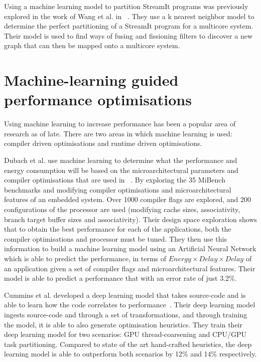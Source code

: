 Using a machine learning model to partition StreamIt programs was previously explored in the work of Wang et al. in ~\cite{wang2013partitionstreamit}.
They use a k nearest neighbor model to determine the perfect partitioning of a StreamIt program for a multicore system. 
Their model is used to find ways of fusing and fissioning filters to discover a new graph that can then be mapped onto a multicore system.


\section{Machine-learning guided performance optimisations}

Using machine learning to increase performance has been a popular area of research as of late.
There are two areas in which machine learning is used: compiler driven optimisations and runtime driven optimisations.

Dubach et al. use machine learning to determine what the performance and energy consumption will be based on the microarchitectural parameters and compiler optimisations that are used in ~\cite{DubachExpl2012}.
By exploring the 35 MiBench benchmarks and modifying compiler optimisations and microarchitectural features of an embedded system.
Over 1000 compiler flags are explored, and 200 configurations of the processor are used (modifying cache sizes, associativity, branch target buffer sizes and associativity).
Their design space exploration shows that to obtain the best performance for each of the applications, both the compiler optimisations and processor must be tuned.
They then use this information to build a machine learning model using an Artificial Neural Network which is able to predict the performance, in terms of $Energy \times Delay \times Delay$ of an application given a set of compiler flags and microarchitectural features.
Their model is able to predict a performance that with an error rate of just 3.2\%.

Cummins et al. developed a deep learning model that takes source-code and is able to learn how the code correlates to performance~\cite{cummins2017pact}.
Their deep learning model ingests source-code and through a set of transformations, and through training the model, it is able to also generate optimisation heuristics.
They train their deep learning model for two scenarios: GPU thread-coarsening and CPU/GPU task partitioning.
Compared to state of the art hand-crafted heuristics, the deep learning model is able to outperform both scenarios by 12\% and 14\% respectively.